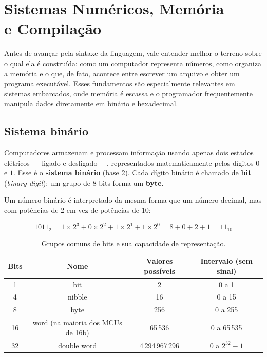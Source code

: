\chapter[Sistemas Numéricos, Memória e Compilação]{Sistemas Numéricos, Memória\\e Compilação}
\label{cap:sistemas-numericos}

Antes de avançar pela sintaxe da linguagem, vale entender melhor o terreno sobre o qual ela é construída: como um computador representa números, como organiza a memória e o que, de fato, acontece entre escrever um arquivo  e obter um programa executável. Esses fundamentos são especialmente relevantes em sistemas embarcados, onde memória é escassa e o programador frequentemente manipula dados diretamente em binário e hexadecimal.

\section{Sistema binário}

Computadores armazenam e processam informação usando apenas dois estados elétricos — ligado e desligado —, representados matematicamente pelos dígitos \(0\) e \(1\). Esse é o \textbf{sistema binário} (base 2). Cada dígito binário é chamado de \textbf{bit} (\emph{binary digit}); um grupo de 8 bits forma um \textbf{byte}.

Um número binário é interpretado da mesma forma que um número decimal, mas com potências de 2 em vez de potências de 10:

\[
1011_2 = 1\times2^3 + 0\times2^2 + 1\times2^1 + 1\times2^0 = 8+0+2+1 = 11_{10}
\]

\begin{table}[h]
\centering
\begin{tabular}{@{}cccc@{}}
\toprule
\textbf{Bits} & \textbf{Nome} & \textbf{Valores possíveis} & \textbf{Intervalo (sem sinal)} \\
\midrule
1 & bit      & 2         & 0 a 1 \\
4 & nibble   & 16        & 0 a 15 \\
8 & byte     & 256       & 0 a 255 \\
16 & word (na maioria dos MCUs de 16b) & 65\,536 & 0 a 65\,535 \\
32 & double word & 4\,294\,967\,296 & 0 a $2^{32}-1$ \\
\bottomrule
\end{tabular}
\caption{Grupos comuns de bits e sua capacidade de representação.}
\end{table}

